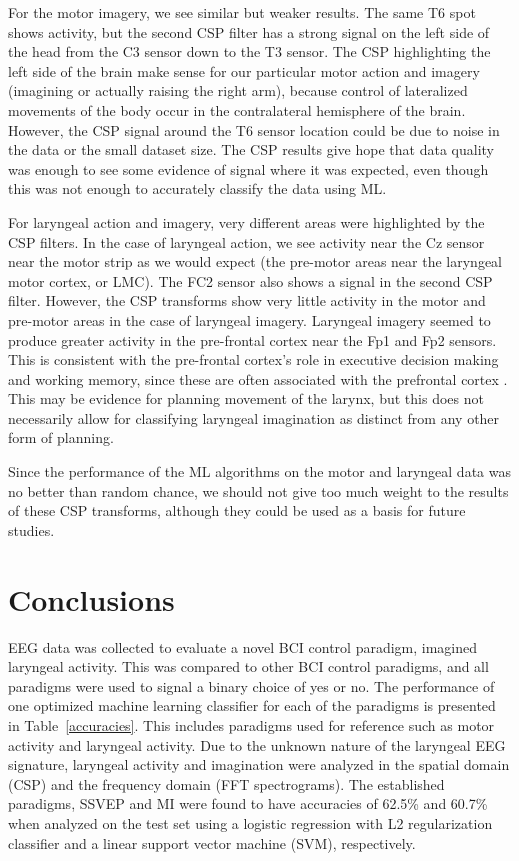 \documentclass{article}
\begin{document}
For the motor imagery, we see similar but weaker results. The same T6 spot shows activity, but the second CSP filter has a strong signal on the left side of the head from the C3 sensor down to the T3 sensor. The CSP highlighting the left side of the brain make sense for our particular motor action and imagery (imagining or actually raising the right arm), because control of lateralized movements of the body occur in the contralateral hemisphere of the brain. However, the CSP signal around the T6 sensor location could be due to noise in the data or the small dataset size. The CSP results give hope that data quality was enough to see some evidence of signal where it was expected, even though this was not enough to accurately classify the data using ML.

For laryngeal action and imagery, very different areas were highlighted by the CSP filters. In the case of laryngeal action, we  see activity near the Cz sensor near the motor strip as we would expect (the pre-motor areas near the laryngeal motor cortex, or LMC). The FC2 sensor also shows a signal in the second CSP filter. However, the CSP transforms show very little activity in the motor and pre-motor areas in the case of laryngeal imagery. Laryngeal imagery seemed to produce greater activity in the pre-frontal cortex near the Fp1 and Fp2 sensors. This is consistent with the pre-frontal cortex's role in executive decision making and working memory, since these are often associated with the prefrontal cortex \citep{Koechlin7651}. This may be evidence for planning movement of the larynx, but this does not necessarily allow for classifying laryngeal imagination as distinct from any other form of planning.

Since the performance of the ML algorithms on the motor and laryngeal data was no better than random chance, we should not give too much weight to the results of these CSP transforms, although they could be used as a basis for future studies.

\section{Conclusions}
EEG data was collected to evaluate a novel BCI control paradigm, imagined laryngeal activity.  This was compared to other BCI control paradigms, and all paradigms were used to signal a binary choice of yes or no. The performance of one optimized machine learning classifier for each of the paradigms is presented in Table~\ref{accuracies}. This includes paradigms used for reference such as motor activity and laryngeal activity. Due to the unknown nature of the laryngeal EEG signature, laryngeal activity and imagination were analyzed in the spatial domain (CSP) and the frequency domain (FFT spectrograms).
The established paradigms, SSVEP and MI were found to have accuracies of 62.5\% and 60.7\% when analyzed on the test set using a logistic regression with L2 regularization classifier and a linear support vector machine (SVM), respectively.
\end{document}

